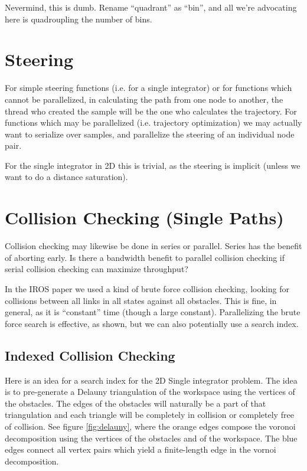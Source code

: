 Nevermind, this is dumb. Rename ``quadrant'' as ``bin'', and all we're advocating here is quadroupling the number of bins.





\section{Steering}

For simple steering functions (i.e. for a single integrator) or for functions which cannot be parallelized, in calculating the path from one node to another, the thread who created the sample will be the one who calculates the trajectory. For functions which may be parallelized (i.e. trajectory optimization) we may actually want to serialize over samples, and parallelize the steering of an individual node pair. 

For the single integrator in 2D this is trivial, as the steering is implicit (unless we want to do a distance saturation).

\section{Collision Checking (Single Paths)}

Collision checking may likewise be done in series or parallel. Series has the benefit of aborting early. Is there a bandwidth benefit to parallel collision checking if serial collision checking can maximize throughput?

In the IROS paper we used a kind of brute force collision checking, looking for collisions between all links in all states against all obstacles. This is fine, in general, as it is ``constant'' time (though a large constant). Parallelizing the brute force search is effective, as shown, but we can also potentially use a search index. 


\subsection{Indexed Collision Checking}

Here is an idea for a search index for the 2D Single integrator problem. The idea is to pre-generate a Delauny triangulation of the workspace using the vertices of the obstacles. The edges of the obstacles will naturally be a part of that triangulation and each triangle will be completely in collision or completely free of collision. See figure \ref{fig:delauny}, where the orange edges compose the voronoi decomposition using the vertices of the obstacles and of the workspace. The blue edges connect all vertex pairs which yield a finite-length edge in the vornoi decomposition.  

